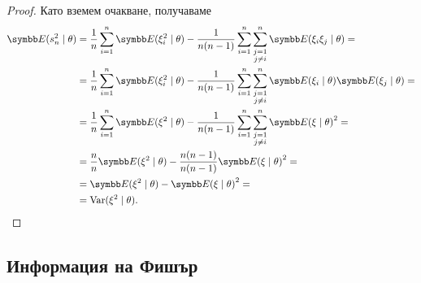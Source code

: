 \documentclass[numbers=endperiod, bibliography=totocnumbered]{scrartcl}
\begin{document}
\begin{proof}
  Като вземем очакване, получаваме
  \begin{align*}
    \Expect(s_n^2 \mid \theta)
    &=
    \frac 1 n \sum_{i=1}^n \Expect(\xi_i^2 \mid \theta) - \frac 1 {n(n-1)} \sum_{i=1}^n \sum_{\substack{j=1 \\ j\neq i}}^n \Expect(\xi_i \xi_j \mid \theta)
    = \\ &=
    \frac 1 n \sum_{i=1}^n \Expect(\xi_i^2 \mid \theta) - \frac 1 {n(n-1)} \sum_{i=1}^n \sum_{\substack{j=1 \\ j\neq i}}^n \Expect(\xi_i \mid \theta) \Expect(\xi_j \mid \theta)
    = \\ &=
    \frac 1 n \sum_{i=1}^n \Expect(\xi^2 \mid \theta) - \frac 1 {n(n-1)} \sum_{i=1}^n \sum_{\substack{j=1 \\ j\neq i}}^n {\Expect(\xi \mid \theta)}^2
    = \\ &=
    \frac n n \Expect(\xi^2 \mid \theta) - \frac {n(n-1)} {n(n-1)} {\Expect(\xi \mid \theta)}^2
    = \\ &=
    \Expect(\xi^2 \mid \theta) - {\Expect(\xi \mid \theta)}^2
    = \\ &=
    \Var(\xi^2 \mid \theta).
  \end{align*}
\end{proof}

\subsection{Информация на Фишър}
\end{document}

